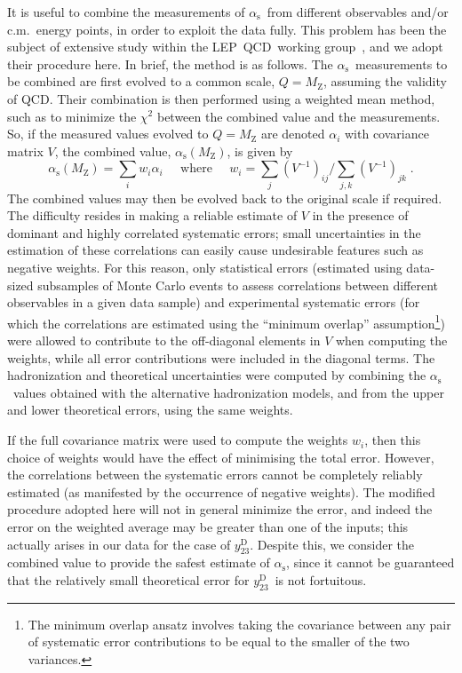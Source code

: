 \documentclass[12pt,a4paper,twoside]{article}
\newcommand{\as}     {\ensuremath{\alpha_{\mathrm{s}}}}
\newcommand{\asmz}   {\ensuremath{\alpha_{\mathrm{s}}(\mz)}}
\newcommand{\mz}     {\ensuremath{M_{\mathrm{Z}}}}
\newcommand{\ytwothree}   {\ensuremath{y^{\mathrm{D}}_{23}}}
\newcommand{\Lep}{\mbox{LEP}}
\newcommand{\qcd}{\mbox{QCD}}
\begin{document}
It is useful to combine the measurements of
\as\ from different observables and/or c.m.\ energy points,
in order to exploit the data fully.  This problem has been
the subject of extensive study within the \Lep\ \qcd\ 
working group~\cite{LEPQCDWG2},
and we adopt their procedure here.  
In brief, the method is as follows.
The \as\ measurements to be combined are first evolved to 
a common scale, $Q=\mz$, assuming the validity of \qcd.  
Their combination is then performed using
a weighted mean method, such as to minimize the $\chi^2$ between 
the combined value and the measurements.  So, if the
measured values evolved to 
$Q=\mz$ are denoted $\alpha_i$ with covariance matrix $V$, 
the combined value, \asmz, is given by
\begin{equation} \asmz = \sum_i w_i \alpha_i \;\;\;\;\; \mathrm{where}\;\;\;\;\;
w_i = \sum_j (V^{-1})_{ij} / \sum_{j,k} (V^{-1})_{jk} \;.\end{equation}
The combined values may then be evolved back to the 
original scale if required.
The difficulty resides in making a reliable estimate of
$V$ in the presence of dominant and highly correlated systematic
errors; small uncertainties in the estimation of these
correlations can easily cause undesirable features such 
as negative weights.  For this reason, only statistical errors
(estimated using data-sized subsamples of Monte Carlo events to
assess correlations between different observables in a given data sample)
and experimental systematic errors 
(for which the correlations are estimated using the ``minimum overlap''
assumption\footnote{The minimum overlap ansatz involves 
taking the covariance
between any pair of systematic error contributions to be 
equal to the smaller of the two variances.}) 
were allowed to contribute to the off-diagonal elements 
in $V$ when computing the weights, while all error contributions were
included in the diagonal terms.
The hadronization and theoretical uncertainties were 
computed by combining the \as\ values obtained with the 
alternative hadronization models, and from the upper and lower    
theoretical errors, using the same weights.

If the full covariance matrix were used to compute the weights $w_i$, then this
choice of weights would have the effect of minimising the total error.
However, the correlations between the systematic errors
cannot be completely reliably estimated (as manifested by the occurrence of 
negative weights).  The modified procedure adopted here will not in general
minimize the error, and indeed the error on the weighted average may be
greater than one of the inputs; this actually arises in our data
for the case of \ytwothree.  Despite this, we consider the 
combined value to provide the safest estimate of \as, since it cannot be guaranteed 
that the relatively small theoretical error for \ytwothree\ is not fortuitous. 
\end{document}
